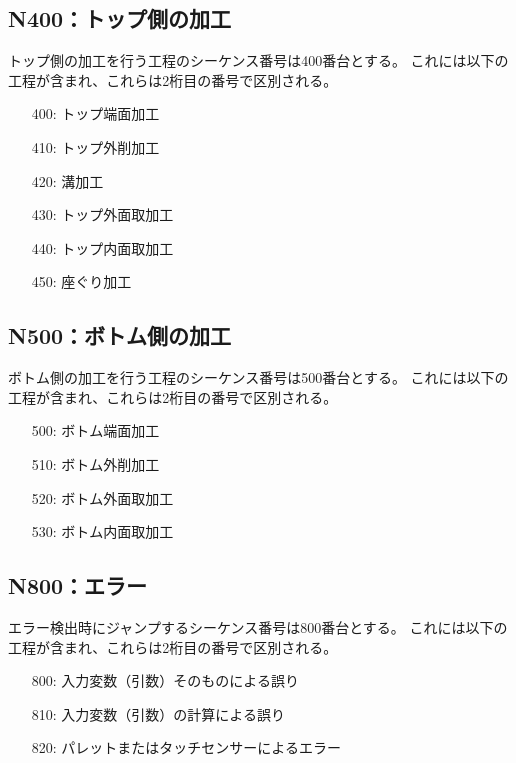 \subsection{N400：トップ側の加工}
トップ側の加工を行う工程のシーケンス番号は400番台とする。
これには以下の工程が含まれ、これらは2桁目の番号で区別される。
\begin{enumerate}
\item[400:] トップ端面加工
\item[410:] トップ外削加工
\item[420:] 溝加工
\item[430:] トップ外面取加工
\item[440:] トップ内面取加工
\item[450:] 座ぐり加工
\end{enumerate}


\subsection{N500：ボトム側の加工}
ボトム側の加工を行う工程のシーケンス番号は500番台とする。
これには以下の工程が含まれ、これらは2桁目の番号で区別される。
\begin{enumerate}
\item[500:] ボトム端面加工
\item[510:] ボトム外削加工
\item[520:] ボトム外面取加工
\item[530:] ボトム内面取加工
\end{enumerate}


\subsection{N800：エラー}
エラー検出時にジャンプするシーケンス番号は800番台とする。
これには以下の工程が含まれ、これらは2桁目の番号で区別される。
\begin{enumerate}
\item[800:] 入力変数（引数）そのものによる誤り
\item[810:] 入力変数（引数）の計算による誤り
\item[820:] パレットまたはタッチセンサーによるエラー
\end{enumerate}


